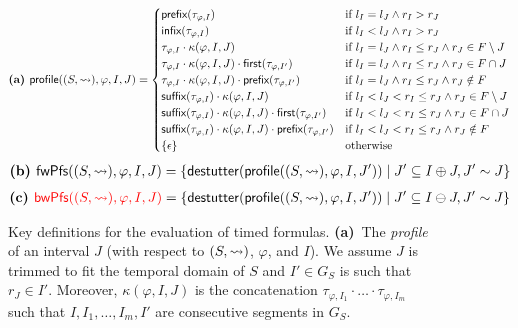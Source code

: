 \begin{figure*}[!t]
	\begin{align*}
		\textbf{(a) }
		\mathsf{profile}((S,{\rightsquigarrow}), \varphi, I, J) =
		\begin{cases}
			\textsf{prefix}(\tau_{\varphi,I}) & \text{if } l_I = l_J \land r_I > r_J \\
			\textsf{infix}(\tau_{\varphi,I}) & \text{if } l_I < l_J \land r_I > r_J \\
			\tau_{\varphi,I} \cdot \kappa(\varphi, I, J) & \text{if } l_I = l_J \land r_I \leq r_J \land r_J \in F \setminus J \\
			\tau_{\varphi,I} \cdot \kappa(\varphi, I, J) \cdot \textsf{first}(\tau_{\varphi,I'}) & \text{if } l_I = l_J \land r_I \leq r_J \land r_J \in F \cap J  \\		
			\tau_{\varphi,I} \cdot \kappa(\varphi, I, J) \cdot \textsf{prefix}(\tau_{\varphi,I'}) & \text{if } l_I = l_J \land r_I \leq r_J \land r_J \notin F  \\
			\textsf{suffix}(\tau_{\varphi,I}) \cdot \kappa(\varphi, I, J) & \text{if }  l_I < l_J < r_I \leq r_J \land r_J \in F \setminus J  \\
			\textsf{suffix}(\tau_{\varphi,I}) \cdot \kappa(\varphi, I, J) \cdot \textsf{first}(\tau_{\varphi,I'}) & \text{if } l_I < l_J < r_I \leq r_J \land r_J \in F \cap J \\
			\textsf{suffix}(\tau_{\varphi,I}) \cdot \kappa(\varphi, I, J) \cdot \textsf{prefix}(\tau_{\varphi,I'}) & \text{if } l_I < l_J < r_I \leq r_J \land r_J \notin F \\
			\{\epsilon\} & \text{otherwise}
		\end{cases}
	\end{align*}
	\begin{align*}
		\textbf{(b) }
		\mathsf{fwPfs}((S,{\hb}), \varphi, I, J) = \{\destutter(\mathsf{profile}((S,{\hb}), \varphi, I, J')) \st J' \subseteq I \oplus J, J' \sim J\}
	\end{align*}
	\begin{align*}
		\textbf{(c) }
		\bgroup \color{red} \mathsf{bwPfs}((S,{\hb}), \varphi, I, J) \egroup = \{\destutter(\mathsf{profile}((S,{\hb}), \varphi, I, J')) \st J' \subseteq I \ominus J, J' \sim J\}
	\end{align*}
	\caption{Key definitions for the evaluation of timed formulas.
		\textbf{(a)}~The \emph{profile} of an interval $J$ (with respect to $(S,{\rightsquigarrow})$, $\varphi$, and $I$).
		We assume $J$ is trimmed to fit the temporal domain of $S$ and $I' \in G_S$ is such that $r_J \in I'$.
		Moreover, $\kappa(\varphi, I, J)$ is the concatenation $\tau_{\varphi,I_1} \cdot \ldots \cdot \tau_{\varphi,I_m}$ such that $I, I_1, \ldots, I_m, I'$ are consecutive segments in $G_S$.
}
\end{figure*}
